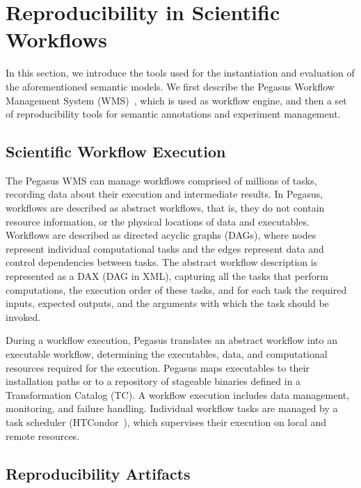 \section{Reproducibility in Scientific Workflows}
\label{sec:reproducibility}

In this section, we introduce the tools used for the instantiation and evaluation 
of the aforementioned semantic models. We first describe the Pegasus Workflow 
Management System (WMS)~\cite{Deelman-FGCS-2014}, which is used as 
workflow engine, and then a set of reproducibility tools for semantic annotations and 
experiment management.


\subsection{Scientific Workflow Execution}

The Pegasus WMS can manage workflows comprised of millions of tasks, recording data 
about their execution and intermediate results. In Pegasus, workflows are described as 
abstract workflows, that is, they do not contain resource information, or the physical locations of 
data and executables. Workflows are described as directed acyclic graphs (DAGs), where 
nodes represent individual computational tasks and the edges represent data and control 
dependencies between tasks. The abstract workflow description is represented as a DAX 
(DAG in XML), capturing all the tasks that perform computations, the execution order of these 
tasks, and for each task the required inputs, expected outputs, and the arguments with which 
the task should be invoked. 

During a workflow execution, Pegasus translates an abstract workflow into an 
executable workflow, determining the executables, data, and computational resources 
required for the execution. Pegasus maps executables to their installation paths or to a 
repository of stageable binaries defined in a Transformation Catalog (TC). 
A workflow 
execution includes data management, monitoring, and failure handling. Individual workflow 
tasks are managed by a task scheduler (HTCondor~\cite{condor}), which supervises their 
execution on local and remote resources.


\subsection{Reproducibility Artifacts}

